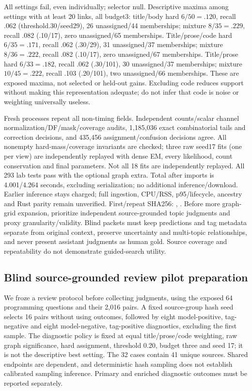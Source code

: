\documentclass[11pt]{article}
\begin{document}
All settings fail, even individually; selector null. Descriptive maxima among
settings with at least 20 links, all budget3: title/body hard $6/50=.120$, recall
.062 (threshold.30/seed29), 26 unassigned/44 memberships; mixture $8/35=.229$,
recall .082 (.10/17), zero unassigned/65 memberships. Title/prose/code hard
$6/35=.171$, recall .062 (.30/29), 31 unassigned/37 memberships; mixture
$8/36=.222$, recall .082 (.10/17), zero unassigned/67 memberships. Title/prose
hard $6/33=.182$, recall .062 (.30/101), 30 unassigned/37 memberships; mixture
$10/45=.222$, recall .103 (.20/101), two unassigned/66 memberships. These are
exposed maxima, not selected or held-out gains. Excluding code reduces support
without making this representation adequate; do not infer that code is noise
or weighting universally useless.

Fresh processes repeat all non-timing fields. Independent counts/scalar channel
normalization/DF/mask/coverage audits, 1,185,036 exact combinatorial tails and
correction decisions, and 435,456 assignment/confusion decisions agree. All
nonempty hard-mass/coverage invariants are checked; three raw seed17 fits
(one per view) are independently replayed with dense EM, every likelihood,
count conservation and final parameters. Not all 18 fits are independently
replayed. All 293 lab tests pass with the optional graph extra. Total after
imports is 4.001/4.264 seconds, excluding serialization; no additional
inference/download. Earlier inference stays charged; full ingestion, CPU/RSS,
p95/lifecycle, ancestry and Rust parity remain unverified. First/repeat SHA256:
,
.
Before more graph-grid expansion, prioritize independent source-grounded topic
judgments and proxy granularity/validity. Blind packets must keep predictions
and tag metadata separate from original context, preserve uncertainty and
multi-topic relationships, and never present assistant judgments as human gold.
Source coverage and repeatability do not demonstrate guided-search utility.

\subsection{Blind source-grounded review pilot preparation}
We froze a review protocol before collecting judgments, using the exposed
64 programming questions and their 2,016 pairs. A fixed source-group hash seed
selects 16 pairs without using outcomes, followed by eight model-positive,
tag-negative and eight model-negative, tag-positive diagnostics, excluding
the first sample. The diagnostic policy is fixed at equal title/prose/code
weighting, raw graph significance, hard assignment, threshold 0.20, budget
three and seed 17; it is not the descriptive best setting. The 32 cases
contain 41 unique sources. Shared endpoints are dependent, and deterministic
hash sampling does not establish calibrated sampling inference. Primary and
enriched diagnostic outcomes must be reported separately.
\end{document}
